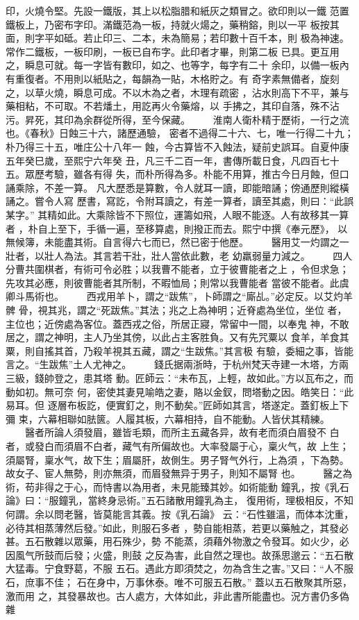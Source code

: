 \documentclass{ctexart}
\begin{document}
印，火燒令堅。先設一鐵版，其上以松脂腊和紙灰之類冒之。欲印則以一鐵 范置鐵板上，乃密布字印。滿鐵范為一板，持就火煬之，藥稍鎔，則以一平 板按其面，則字平如砥。若止印三、二本，未為簡易；若印數十百千本，則 极為神速。常作二鐵板，一板印刷，一板已自布字。此印者才畢，則第二板 已具。更互用之，瞬息可就。每一字皆有數印，如之、也等字，每字有二十 余印，以備一板內有重復者。不用則以紙貼之，每韻為一貼，木格貯之。有 奇字素無備者，旋刻之，以草火燒，瞬息可成。不以木為之者，木理有疏密 ，沾水則高下不平，兼与藥相粘，不可取。不若燔土，用訖再火令藥熔，以 手拂之，其印自落，殊不沾污。昇死，其印為余群從所得，至今保藏。 　　淮南人衛朴精于歷術，一行之流也。《春秋》日蝕三十六，諸歷通驗， 密者不過得二十六、七，唯一行得二十九；朴乃得三十五，唯庄公十八年一 蝕，今古算皆不入蝕法，疑前史誤耳。自夏仲康五年癸巳歲，至熙宁六年癸 丑，凡三千二百一年，書傳所載日食，凡四百七十五。眾歷考驗，雖各有得 失，而朴所得為多。朴能不用算，推古今日月蝕，但口誦乘除，不差一算。 凡大歷悉是算數，令人就耳一讀，即能暗誦；傍通歷則縱橫誦之。嘗令人寫 歷書，寫訖，令附耳讀之，有差一算者，讀至其處，則曰：``此誤某字。'' 其精如此。大乘除皆不下照位，運籌如飛，人眼不能逐。人有故移其一算者 ，朴自上至下，手循一遍，至移算處，則撥正而去。熙宁中撰《奉元歷》， 以無候簿，未能盡其術。自言得六七而已，然已密于他歷。 　　醫用艾一灼謂之一壯者，以壯人為法。其言若干壯，壯人當依此數，老 幼羸弱量力減之。 　　四人分曹共圍棋者，有術可令必胜；以我曹不能者，立于彼曹能者之上 ，令但求急；先攻其必應，則彼曹能者其所制，不暇恤局；則常以我曹能者 當彼不能者。此虞卿斗馬術也。 　　西戎用羊卜，謂之``跋焦''，卜師謂之``廝乩。''必定反。以艾灼羊髀 骨，視其兆，謂之``死跋焦。''其法；兆之上為神明；近脊處為坐位，坐位 者，主位也；近傍處為客位。蓋西戎之俗，所居正寢，常留中一間，以奉鬼 神，不敢居之，謂之神明，主人乃坐其傍，以此占主客胜負。又有先咒粟以 食羊，羊食其粟，則自搖其首，乃殺羊視其五藏，謂之``生跋焦。''其言极 有驗，委細之事，皆能言之。``生跋焦''土人尤神之。 　　錢氏据兩浙時，于杭州梵天寺建一木塔，方兩三級，錢帥登之，患其塔 動。匠師云：``未布瓦，上輕，故如此。''方以瓦布之，而動如初。無可奈 何，密使其妻見喻皓之妻，賂以金釵，問塔動之因。皓笑日：``此易耳。但 逐層布板訖，便實釘之，則不動矣。''匠師如其言，塔遂定。蓋釘板上下彌 束，六幕相聯如胠篋。人履其板，六幕相持，自不能動。人皆伏其精練。 　　醫者所論人須發眉，雖皆毛類，而所主五藏各异，故有老而須白眉發不 白者，或發白而須眉不白者，藏气有所偏故也。大率發屬于心，稟火气，故 上生；須屬腎，稟水气，故下生；眉屬肝，故側生。男子腎气外行，上為須 ，下為勢。故女子、宦人無勢，則亦無須，而眉發無异于男子，則知不屬腎 也。 　　醫之為術，苟非得之于心，而恃書以為用者，未見能臻其妙。如術能動 鐘乳，按《乳石論》曰：``服鐘乳，當終身忌術。''五石諸散用鐘乳為主， 復用術，理极相反，不知何謂。余以問老醫，皆莫能言其義。按《乳石論》 云：``石性雖溫，而体本沈重，必待其相蒸薄然后發。''如此，則服石多者 ，勢自能相蒸，若更以藥触之，其發必甚。五石散雜以眾藥，用石殊少，勢 不能蒸，須藉外物激之令發耳。如火少，必因風气所鼓而后發；火盛，則鼓 之反為害，此自然之理也。故孫思邈云：``五石散大猛毒。宁食野葛，不服 五石。遇此方即須焚之，勿為含生之害。''又曰：``人不服石，庶事不佳； 石在身中，万事休泰。唯不可服五石散。'' 蓋以五石散聚其所惡，激而用 之，其發暴故也。古人處方，大体如此，非此書所能盡也。況方書仍多偽雜 
\end{document}
